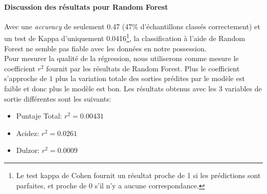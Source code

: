 \newpage


\paragraph{Discussion des résultats pour Random Forest}
Avec une \textit{accuracy} de seulement 0.47  (47\% d'échantillons classés correctement) et un test de Kappa d'uniquement 0.0416\footnote{Le test kappa de Cohen fournit un résultat proche de 1 si les prédictions sont parfaites, et proche de 0 s'il n'y a aucune correspondance.}, la classification à l'aide de Random Forest ne semble pas fiable avec les données en notre possession. \\

\noindent Pour mesurer la qualité de la régression, nous utiliserons comme mesure le coefficient $r^2$ fournit par les résultats de Random Forest. Plus le coefficient s'approche de $1$ plus la variation totale des sorties prédites par le modèle est faible et donc plus le modèle est bon. Les résultats obtenus avec les 3 variables de sortie différentes sont les suivants: \\


\begin{itemize}
	\item Puntaje Total: $r^2 = 0.00431$
	\item Acidez: $r^2 = 0.0261$
	\item Dulzor: $r^2 = 0.0009$
\end{itemize} 












